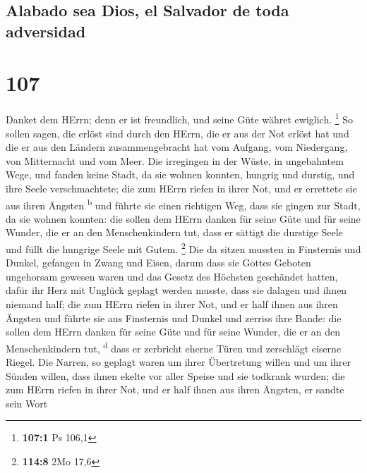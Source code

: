 \hypertarget{alabado-sea-dios-el-salvador-de-toda-adversidad}{%
\subsection{Alabado sea Dios, el Salvador de toda
adversidad}\label{alabado-sea-dios-el-salvador-de-toda-adversidad}}

\hypertarget{section-106}{%
\section{107}\label{section-106}}

 Danket dem HErrn; denn er ist freundlich, und seine Güte
währet ewiglich. \footnote{\textbf{107:1} Ps 106,1}  So
sollen sagen, die erlöst sind durch den HErrn, die er aus der Not erlöst
hat  und die er aus den Ländern zusammengebracht hat vom
Aufgang, vom Niedergang, von Mitternacht und vom Meer. 
Die irregingen in der Wüste, in ungebahntem Wege, und fanden keine
Stadt, da sie wohnen konnten,  hungrig und durstig, und
ihre Seele verschmachtete;  die zum HErrn riefen in ihrer
Not, und er errettete sie aus ihren Ängsten \textsuperscript{b}
 und führte sie einen richtigen Weg, dass sie gingen zur
Stadt, da sie wohnen konnten:  die sollen dem HErrn danken
für seine Güte und für seine Wunder, die er an den Menschenkindern tut,
 dass er sättigt die durstige Seele und füllt die hungrige
Seele mit Gutem. \footnote{\textbf{114:8} 2Mo 17,6}  Die
da sitzen mussten in Finsternis und Dunkel, gefangen in Zwang und Eisen,
 darum dass sie Gottes Geboten ungehorsam gewesen waren
und das Gesetz des Höchsten geschändet hatten,  dafür ihr
Herz mit Unglück geplagt werden musste, dass sie dalagen und ihnen
niemand half;  die zum HErrn riefen in ihrer Not, und er
half ihnen aus ihren Ängsten  und führte sie aus
Finsternis und Dunkel und zerriss ihre Bande:  die sollen
dem HErrn danken für seine Güte und für seine Wunder, die er an den
Menschenkindern tut, \textsuperscript{d}  dass er
zerbricht eherne Türen und zerschlägt eiserne Riegel. 
Die Narren, so geplagt waren um ihrer Übertretung willen und um ihrer
Sünden willen,  dass ihnen ekelte vor aller Speise und
sie todkrank wurden;  die zum HErrn riefen in ihrer Not,
und er half ihnen aus ihren Ängsten,  er sandte sein Wort
